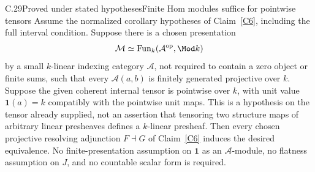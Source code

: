 \begin{claim}{C.29}{Proved under stated hypotheses}{Finite Hom modules suffice for pointwise tensors}\label{C29}
Assume the normalized corollary hypotheses of Claim~\ref{C6}, including the full interval condition. Suppose there is a chosen presentation
\[
 \mathcal M\simeq\operatorname{Fun}_k(\mathcal A^{\mathrm{op}},\Mod k)
\]
by a small $k$-linear indexing category $\mathcal A$, not required to contain a zero object or finite sums, such that every $\mathcal A(a,b)$ is finitely generated projective over $k$. Suppose the given coherent internal tensor is pointwise over $k$, with unit value $\mathbf1(a)=k$ compatibly with the pointwise unit maps. This is a hypothesis on the tensor already supplied, not an assertion that tensoring two structure maps of arbitrary linear presheaves defines a $k$-linear presheaf. Then every chosen projective resolving adjunction $F\dashv G$ of Claim~\ref{C6} induces the desired equivalence. No finite-presentation assumption on $\mathbf1$ as an $\mathcal A$-module, no flatness assumption on $J$, and no countable scalar form is required.
\end{claim}
